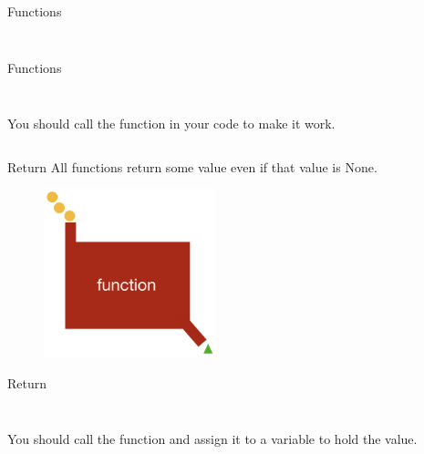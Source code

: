         \begin{frame}{Functions}
            \inputminted[frame=single,framesep=2pt, lastline=8]{python3}{code-examples/function_ex.py}
            \pause
            \inputminted[frame=single,framesep=2pt, lastline=8]{python3}{code-examples/function_ex2.py}
        \end{frame}

        \begin{frame}{Functions}
            \begin{columns}
                \begin{column}{0.50\textwidth}
                \inputminted[frame=single,framesep=2pt, lastline=8]{python3}{code-examples/function_ex3.py}
                You should call the function in your code to make it work.
                \pause
                \end{column}
                \begin{column}{0.50\textwidth}
                \inputminted[frame=single,framesep=2pt, lastline=15]{python3}{code-examples/function_ex4.py}
                \end{column}
            \end{columns}
        \end{frame}

        \begin{frame}{Return}
        All functions return some value even if that value is None.
            \begin{figure}[H]
                \centering
                \includegraphics[width=50mm]{code-examples/function.png}
                \end{figure}
        \end{frame}

        \begin{frame}{Return}
            \begin{columns}
                \begin{column}{0.50\textwidth}
                    \inputminted[frame=single,framesep=2pt, lastline=15]{python3}{code-examples/return1.py}
                    You should call the function and assign it to a variable to hold the value.
                \end{column}
                \begin{column}{0.50\textwidth}
                    \inputminted[frame=single,framesep=2pt, lastline=15]{python3}{code-examples/return1_1.py}
                \end{column}
            \end{columns}
        \end{frame}

